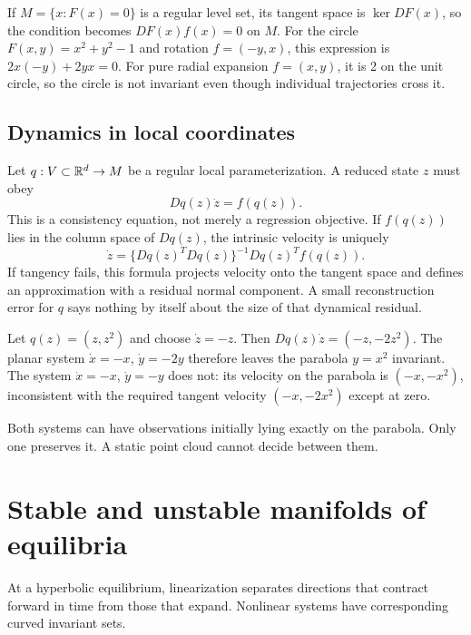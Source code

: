 If $M=\{x:F(x)=0\}$ is a regular level set, its tangent space is $\ker DF(x)$, so the condition becomes $DF(x)f(x)=0$ on $M$. For the circle $F(x,y)=x^2+y^2-1$ and rotation $f=(-y,x)$, this expression is $2x(-y)+2yx=0$. For pure radial expansion $f=(x,y)$, it is 2 on the unit circle, so the circle is not invariant even though individual trajectories cross it.

\subsection{Dynamics in local coordinates}
Let $q:V\subset\mathbb{R}^d\to M$ be a regular local parameterization. A reduced state $z$ must obey
\begin{equation}\label{eq:reduced-invariance}
Dq(z)\dot z=f(q(z)).
\end{equation}
This is a consistency equation, not merely a regression objective. If $f(q(z))$ lies in the column space of $Dq(z)$, the intrinsic velocity is uniquely
\begin{equation}
\dot z=\{Dq(z)^TDq(z)\}^{-1}Dq(z)^Tf(q(z)).
\end{equation}
If tangency fails, this formula projects velocity onto the tangent space and defines an approximation with a residual normal component. A small reconstruction error for $q$ says nothing by itself about the size of that dynamical residual.

\begin{example}
Let $q(z)=(z,z^2)$ and choose $\dot z=-z$. Then $Dq(z)\dot z=(-z,-2z^2)$. The planar system $\dot x=-x$, $\dot y=-2y$ therefore leaves the parabola $y=x^2$ invariant. The system $\dot x=-x$, $\dot y=-y$ does not: its velocity on the parabola is $(-x,-x^2)$, inconsistent with the required tangent velocity $(-x,-2x^2)$ except at zero.
\end{example}
Both systems can have observations initially lying exactly on the parabola. Only one preserves it. A static point cloud cannot decide between them.

\section{Stable and unstable manifolds of equilibria}
At a hyperbolic equilibrium, linearization separates directions that contract forward in time from those that expand. Nonlinear systems have corresponding curved invariant sets.

